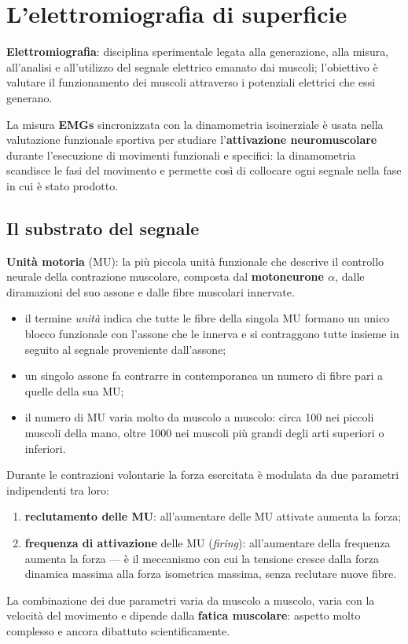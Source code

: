 \chapter{L'elettromiografia di superficie}

\textbf{Elettromiografia}: disciplina sperimentale legata alla generazione, alla misura, all'analisi
e all'utilizzo del segnale elettrico emanato dai muscoli; l'obiettivo è valutare il funzionamento
dei muscoli attraverso i potenziali elettrici che essi generano.

La misura \textbf{EMGs} sincronizzata con la dinamometria isoinerziale è usata nella valutazione
funzionale sportiva per studiare l'\textbf{attivazione neuromuscolare} durante l'esecuzione di
movimenti funzionali e specifici: la dinamometria scandisce le fasi del movimento e permette così di
collocare ogni segnale nella fase in cui è stato prodotto.

\section{Il substrato del segnale}

\textbf{Unità motoria} (MU): la più piccola unità funzionale che descrive il controllo neurale della
contrazione muscolare, composta dal \textbf{motoneurone $\alpha$}, dalle diramazioni del suo assone
e dalle fibre muscolari innervate.
\begin{itemize}
  \item il termine \textit{unità} indica che tutte le fibre della singola MU formano un unico blocco
    funzionale con l'assone che le innerva e si contraggono tutte insieme in seguito al segnale
    proveniente dall'assone;
  \item un singolo assone fa contrarre in contemporanea un numero di fibre pari a quelle della sua
    MU;
  \item il numero di MU varia molto da muscolo a muscolo: circa 100 nei piccoli muscoli della mano,
    oltre 1000 nei muscoli più grandi degli arti superiori o inferiori.
\end{itemize}

Durante le contrazioni volontarie la forza esercitata è modulata da due parametri indipendenti tra
loro:
\begin{enumerate}
  \item \textbf{reclutamento delle MU}: all'aumentare delle MU attivate aumenta la forza;
  \item \textbf{frequenza di attivazione} delle MU (\textit{firing}): all'aumentare della frequenza
    aumenta la forza --- è il meccanismo con cui la tensione cresce dalla forza dinamica massima
    alla forza isometrica massima, senza reclutare nuove fibre.
\end{enumerate}
La combinazione dei due parametri varia da muscolo a muscolo, varia con la velocità del movimento e
dipende dalla \textbf{fatica muscolare}: aspetto molto complesso e ancora dibattuto
scientificamente.

